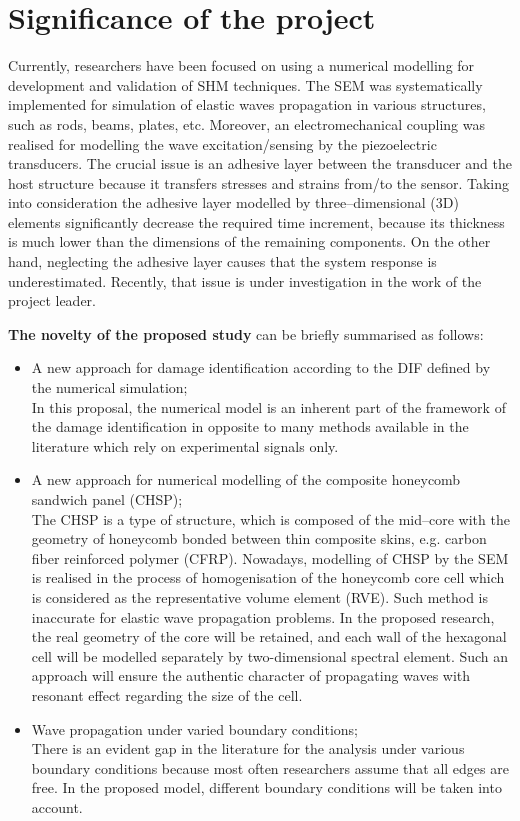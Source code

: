 \documentclass[a4paper,12pt]{article}
\begin{document}
\section{Significance of the project}
Currently, researchers have been focused on using a numerical modelling for development and validation of SHM techniques. The SEM was systematically implemented for simulation of elastic waves propagation in various structures, such as rods, beams, plates, etc. Moreover, an electromechanical coupling was realised for modelling the wave excitation/sensing by the piezoelectric transducers. The crucial issue is an adhesive layer between the transducer and the host structure because it transfers stresses and strains from/to the sensor. Taking into consideration the adhesive layer modelled by three--dimensional (3D) elements significantly decrease the required time increment, because its thickness is much lower than the dimensions of the remaining components. On the other hand, neglecting the adhesive layer causes that the system response is underestimated. Recently, that issue is under investigation in the work of the project leader.

\textbf{The novelty of the proposed study} can be briefly summarised as follows:
\begin{itemize}
	\item A new approach for damage identification according to the DIF defined by the numerical simulation;\\
		In this proposal, the numerical model is an inherent part of the framework of the damage identification in opposite to many methods available in the literature which rely on experimental signals only. 
	\item A new approach for numerical modelling of the composite honeycomb sandwich panel (CHSP);\\
		The CHSP is a type of structure, which is composed of the mid--core with the geometry of honeycomb bonded between thin composite skins, e.g. carbon fiber reinforced polymer (CFRP). Nowadays, modelling of CHSP by the SEM is realised in the process of homogenisation of the honeycomb core cell which is considered as the representative volume element (RVE). Such method is inaccurate for elastic wave propagation problems. In the proposed research, the real geometry of the core will be retained, and each wall of the hexagonal cell will be modelled separately by two-dimensional spectral element. Such an approach will ensure the authentic character of propagating waves with resonant effect regarding the size of the cell. 
	\item Wave propagation under varied boundary conditions;\\
		There is an evident gap in the literature for the analysis under various boundary conditions because most often researchers assume that all edges are free. In the proposed model, different boundary conditions will be taken into account.
\end{itemize}
\end{document}

